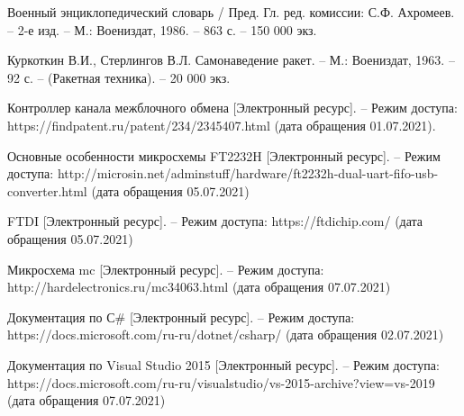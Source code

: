 \newpage
	\begin{thebibliography}{9} 
		
		 Военный энциклопедический словарь / Пред. Гл. ред. комиссии: С.Ф. Ахромеев. – 2-е изд. – М.: Воениздат, 1986. – 863 с. – 150 000 экз.
		
		 Куркоткин В.И., Стерлингов В.Л. Самонаведение ракет. – М.: Воениздат, 1963. – 92 с. – (Ракетная техника). – 20 000 экз. 
		
		 Контроллер канала межблочного обмена [Электронный ресурс]. – Режим доступа: https://findpatent.ru/patent/234/2345407.html    (дата обращения 01.07.2021).
		
		 Основные особенности микросхемы FT2232H [Электронный ресурс]. – Режим доступа: http://microsin.net/adminstuff/hardware/ft2232h-dual-uart-fifo-usb-converter.html  (дата обращения 05.07.2021)
		
		 FTDI [Электронный ресурс]. – Режим доступа: https://ftdichip.com/  (дата обращения 05.07.2021)
		
		 Микросхема mc [Электронный ресурс]. – Режим доступа: http://hardelectronics.ru/mc34063.html (дата обращения 07.07.2021)
		
		 Документация по С\# [Электронный ресурс]. – Режим доступа: https://docs.microsoft.com/ru-ru/dotnet/csharp/  (дата обращения 02.07.2021)
		
		 Документация по Visual Studio 2015 [Электронный ресурс]. – Режим доступа: https://docs.microsoft.com/ru-ru/visualstudio/vs-2015-archive?view=vs-2019   (дата обращения 07.07.2021)
		
		
		
		
	\end{thebibliography}